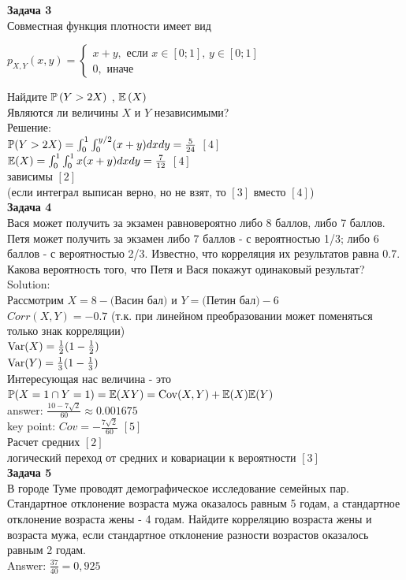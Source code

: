\documentclass[12pt, a4paper]{article}\usepackage[]{graphicx}\usepackage[]{color}
\begin{document}
	\textbf{Задача 3} \\ %
	Совместная функция плотности имеет вид

	$p_{X,Y} \left(x,y\right)=\left\{\begin{array}{l} {x+y,
		\text{ если } x\in \left[0;1\right],\, y\in \left[0;1\right]} \\
	{0,\text{ иначе} } \end{array}\right. $

	Найдите  $\P\left(Y>2X\right)$ ,  $\E\left(X\right)$ \\
	Являются ли величины $X$ и $Y$ независимыми? \\
	Решение: \\
	$\P(Y>2X)=\int_{0}^{1}\int_{0}^{y/2}(x+y)dxdy=\frac{5}{24}$ $[4]$\\
	$\E(X)=\int_{0}^{1}\int_{0}^{1}x(x+y)dxdy=\frac{7}{12}$ $[4]$\\
	зависимы $[2]$ \\
	(если интеграл выписан верно, но не взят, то $[3]$ вместо $[4]$) \\


	\textbf{Задача 4} \\
	Вася может получить за экзамен равновероятно либо 8 баллов, либо 7 баллов. Петя может получить за экзамен либо 7 баллов - с вероятностью 1/3; либо 6 баллов - с вероятностью 2/3. Известно, что корреляция их результатов равна 0.7. \\
	Какова вероятность того, что Петя и Вася покажут одинаковый результат? \\
	Solution: \\
	Рассмотрим $X=8-($Васин бал$)$ и $Y=($Петин бал$)-6$ \\
	$Corr(X,Y)=-0.7$ (т.к. при линейном преобразовании может поменяться только знак корреляции) \\
	$\Var(X)=\frac{1}{2}(1-\frac{1}{2})$ \\
	$\Var(Y)=\frac{1}{3}(1-\frac{1}{3})$ \\
	Интересующая нас величина - это $\P(X=1\cap Y=1)=\E(XY)=\Cov(X,Y)+\E(X)\E(Y)$ \\
	answer: $\frac{10-7\sqrt{2}}{60}\approx 0.001675$ \\
	key point: $Cov=-\frac{7\sqrt{2}}{60}$ $[5]$ \\
	Расчет средних $[2]$ \\
	логический переход от средних и ковариации к вероятности $[3]$ \\


	\textbf{Задача 5} \\ %
	В городе Туме проводят демографическое исследование семейных пар. Стандартное отклонение возраста мужа оказалось равным 5 годам, а стандартное отклонение возраста жены - 4 годам. Найдите корреляцию возраста жены и возраста мужа, если стандартное отклонение разности возрастов оказалось равным 2 годам. \\
	Answer: $\frac{37}{40}=0,925$ \\
\end{document}
